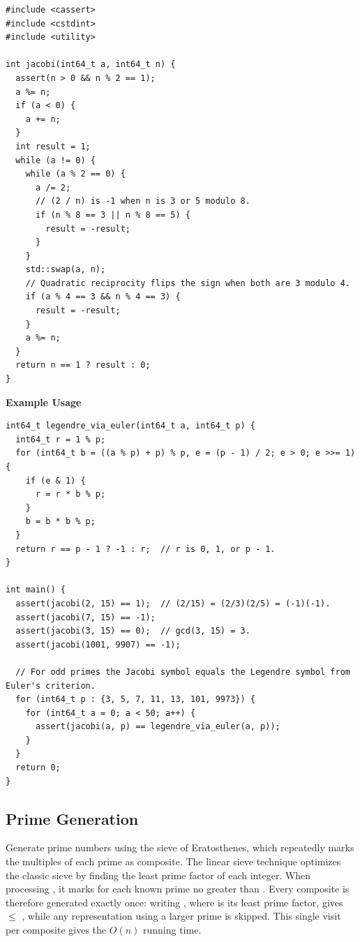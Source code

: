 \begin{lstlisting}[style=cpp]
#include <cassert>
#include <cstdint>
#include <utility>

int jacobi(int64_t a, int64_t n) {
  assert(n > 0 && n % 2 == 1);
  a %= n;
  if (a < 0) {
    a += n;
  }
  int result = 1;
  while (a != 0) {
    while (a % 2 == 0) {
      a /= 2;
      // (2 / n) is -1 when n is 3 or 5 modulo 8.
      if (n % 8 == 3 || n % 8 == 5) {
        result = -result;
      }
    }
    std::swap(a, n);
    // Quadratic reciprocity flips the sign when both are 3 modulo 4.
    if (a % 4 == 3 && n % 4 == 3) {
      result = -result;
    }
    a %= n;
  }
  return n == 1 ? result : 0;
}
\end{lstlisting}
\textbf{Example Usage}\par
\begin{lstlisting}[style=cpp]
int64_t legendre_via_euler(int64_t a, int64_t p) {
  int64_t r = 1 % p;
  for (int64_t b = ((a % p) + p) % p, e = (p - 1) / 2; e > 0; e >>= 1) {
    if (e & 1) {
      r = r * b % p;
    }
    b = b * b % p;
  }
  return r == p - 1 ? -1 : r;  // r is 0, 1, or p - 1.
}

int main() {
  assert(jacobi(2, 15) == 1);  // (2/15) = (2/3)(2/5) = (-1)(-1).
  assert(jacobi(7, 15) == -1);
  assert(jacobi(3, 15) == 0);  // gcd(3, 15) = 3.
  assert(jacobi(1001, 9907) == -1);

  // For odd primes the Jacobi symbol equals the Legendre symbol from Euler's criterion.
  for (int64_t p : {3, 5, 7, 11, 13, 101, 9973}) {
    for (int64_t a = 0; a < 50; a++) {
      assert(jacobi(a, p) == legendre_via_euler(a, p));
    }
  }
  return 0;
}
\end{lstlisting}
\subsection{Prime Generation}
\label{sec:6.3.8}
Generate prime numbers using the sieve of Eratosthenes, which repeatedly marks the multiples of each prime as composite. The linear sieve technique optimizes the classic sieve by finding the least prime factor of each integer. When processing , it marks  for each known prime  no greater than . Every composite  is therefore generated exactly once: writing , where  is its least prime factor, gives  $\leq$ , while any representation using a larger prime is skipped. This single visit per composite gives the $O(n)$ running time.

